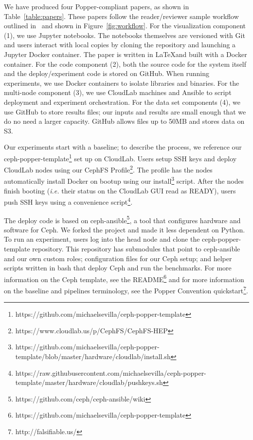 We have produced four Popper-compliant papers, as shown in
Table~\ref{table:papers}. These papers follow the reader/reviewer sample
workflow outlined in~\cite{jimenez:ipdpsw17-popper} and shown in
Figure~\ref{fig:workflow}. For the visualization component (1), we use Jupyter
notebooks. The notebooks themselves are versioned with Git and users interact
with local copies by cloning the repository and launching a Jupyter Docker
container. The paper is written in \LaTeX and built with a Docker container.
For the code component (2), both the source code for the system itself and the
deploy/experiment code is stored on GitHub. When running experiments, we use
Docker containers to isolate libraries and binaries. For the multi-node
component (3), we use CloudLab machines and Ansible to script deployment and
experiment orchestration. For the data set components (4), we use GitHub to
store results files; our inputs and results are small enough that we do no need
a larger capacity.  GitHub allows files up to 50MB and stores data on S3.

Our experiments start with a baseline; to describe the process, we reference
our
ceph-popper-template\footnote{https://github.com/michaelsevilla/ceph-popper-template}
set up on CloudLab. Users setup SSH keys and deploy CloudLab nodes using our
CephFS Profile\footnote{https://www.cloudlab.us/p/CephFS/CephFS-HEP}.  The
profile has the nodes automatically install Docker on bootup using our
install\footnote{https://github.com/michaelsevilla/ceph-popper-template/blob/master/hardware/cloudlab/\-install.sh}
script. After the nodes finish booting ({\it i.e.}  their status on the
CloudLab GUI read as READY), users push SSH keys using a convenience
script\footnote{https://raw.githubusercontent.com/michaelsevilla/ceph-popper-template/master/hardware/cloudlab/pushkeys.sh}.

The deploy code is based on
ceph-ansible\footnote{https://github.com/ceph/ceph-ansible/wiki}, a tool that
configures hardware and software for Ceph. We forked the project and made it
less dependent on Python. To run an experiment, users log into the head node
and clone the ceph-popper-template repository. This repository has submodules
that point to ceph-ansible and our own custom roles; configuration files for
our Ceph setup; and helper scripts written in bash that deploy Ceph and run the
benchmarks.  For more information on the Ceph template, see the
README\footnote{https://github.com/michaelsevilla/ceph-popper-template} and for
more information on the baseline and pipelines terminology, see the Popper
Convention quickstart\footnote{http://falsifiable.us/}. 

